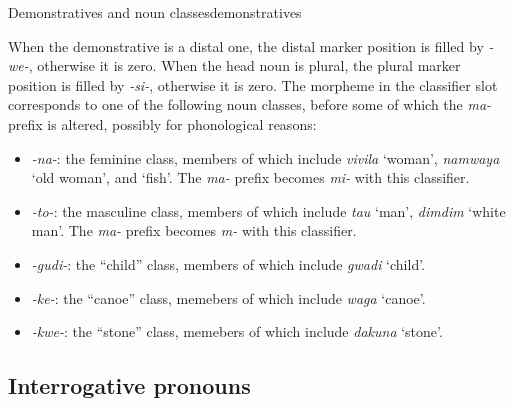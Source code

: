 \documentclass{article}
\newcommand*{\corpus}[1]{\emph{#1}}
\newcommand{\translate}[1]{`#1'}
\begin{document}
\begin{infobox}{Demonstratives and noun classes}{demonstratives}
\begin{center}
    \end{center}
    When the demonstrative is a distal one,
    the distal marker position is filled by \corpus{-we-},
    otherwise it is zero.
    When the head noun is plural,
    the plural marker position is filled by \corpus{-si-},
    otherwise it is zero.
    The morpheme in the classifier slot corresponds to one of the following noun classes,
    before some of which the \corpus{ma-} prefix is altered, possibly for phonological reasons:
    \begin{itemize}
        \item \corpus{-na-}: the feminine class, members of which include 
        \corpus{vivila} \translate{woman}, \corpus{namwaya} \translate{old woman}, 
        and \translate{fish}.
        The \corpus{ma-} prefix becomes \corpus{mi-} with this classifier.
        \item \corpus{-to-}: the masculine class, members of which include 
        \corpus{tau} \translate{man}, \corpus{dimdim} \translate{white man}.
        The \corpus{ma-} prefix becomes \corpus{m-} with this classifier.
        \item \corpus{-gudi-}: the ``child'' class, 
        members of which include \corpus{gwadi} \translate{child}.
        \item \corpus{-ke-}: the ``canoe'' class,
        memebers of which include \corpus{waga} \translate{canoe}.
        \item \corpus{-kwe-}: the ``stone'' class,
        memebers of which include \corpus{dakuna} \translate{stone}.
    \end{itemize}
\end{infobox}

\subsection{Interrogative pronouns}
\end{document}
